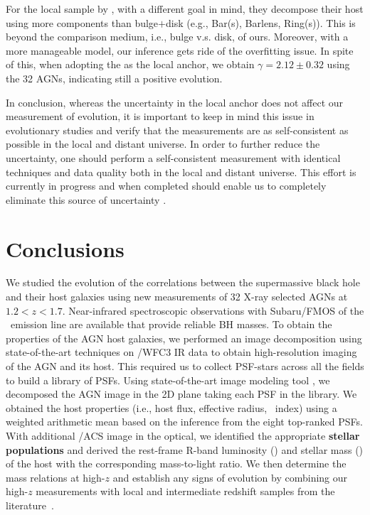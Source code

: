 \documentclass[apj]{emulateapj}
\begin{document}
{For the local sample by \citet{Bentz2018}, with a different goal in mind, they decompose their host using more components than bulge$+$disk (e.g., Bar(s), Barlens, Ring(s)). This is beyond the comparison medium, i.e., bulge v.s. disk, of ours. Moreover, with a more manageable model, our inference gets ride of the overfitting issue. In spite of this, when adopting the \citet{Bentz2018} as the local anchor, we obtain $\gamma = 2.12\pm 0.32$ using the 32 AGNs, indicating still a positive evolution.
 }

In conclusion, whereas the uncertainty in the local anchor does not affect our measurement of evolution, it is important to keep in mind this issue in evolutionary studies and verify that the measurements are as self-consistent as possible in the local and distant universe. In order to further reduce the uncertainty, one should perform a self-consistent measurement with identical techniques and data quality both in the local and distant universe. This effort is currently in progress and when completed should enable us to completely eliminate this source of uncertainty \citep{Bennert11,Harris2012, Bennert2015}.


\section{Conclusions} \label{sec:sum}

We studied the evolution of the correlations between the supermassive black hole and their host galaxies using new measurements of 32 X-ray selected AGNs at $1.2<z<1.7$. Near-infrared spectroscopic observations with Subaru/FMOS of the \halpha\ emission line are available that provide reliable BH masses. To obtain the properties of the AGN host galaxies, we performed an image decomposition using state-of-the-art techniques on \hst/WFC3 IR data to obtain high-resolution imaging of the AGN and its host. This required us to collect PSF-stars across all the fields to build a library of PSFs. Using state-of-the-art image modeling tool \lenstronomy, we decomposed the AGN image in the 2D plane taking each PSF in the library. We obtained the host properties (i.e., host flux, effective radius, \sersic\ index) using a weighted arithmetic mean based on the inference from the eight top-ranked PSFs. With additional \hst/ACS image in the optical, we identified the appropriate {\bf stellar populations} and derived the rest-frame R-band luminosity (\lhost) and stellar mass (\smass) of the host with the corresponding mass-to-light ratio.
We then determine the mass relations at high-$z$ and establish any signs of evolution by combining our high-$z$ measurements with local and intermediate redshift samples from the literature~\citep{Park15, Bennert11, SS13, Cisternas2011}. 
\end{document}
